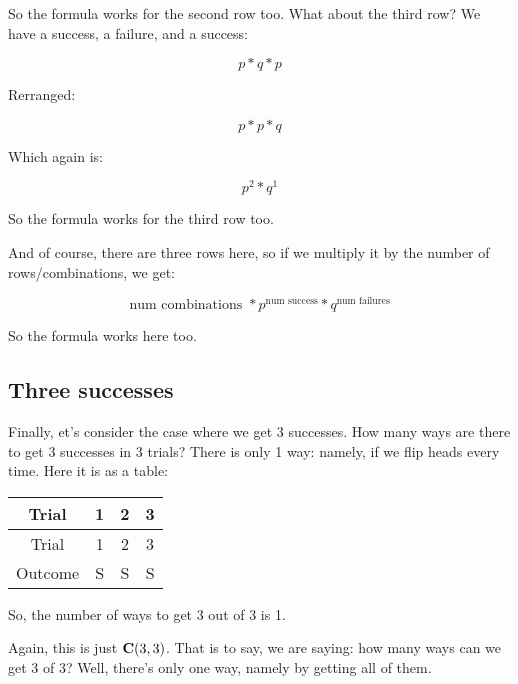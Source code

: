 \documentclass[../../../main.tex]{subfiles}
\begin{document}
So the formula works for the second row too. What about the third row? We have a success, a failure, and a success:

\begin{equation*}
    p * q * p
\end{equation*}

Rerranged:

\begin{equation*}
    p * p * q
\end{equation*}

Which again is:

\begin{equation*}
    p^{2} * q^{1}
\end{equation*}

So the formula works for the third row too.

And of course, there are three rows here, so if we multiply it by the number of rows/combinations, we get:

\begin{equation*}
    \text{num combinations } * p^{\text{num success}} * q^{\text{num failures}}
\end{equation*}

So the formula works here too.


\subsection{Three successes}

Finally, et's consider the case where we get 3 successes. How many ways are there to get 3 successes in 3 trials? There is only 1 way: namely, if we flip heads every time. Here it is as a table:

\begin{center}
  \begin{tabular}{| c | c | c | c |}
    \hline
      \textbf{Trial} & \textbf{1} & \textbf{2} & \textbf{3} \\ \hline
    Trial & 1 & 2 & 3 \\ \hline
  Outcome & S & S & S \\ \hline
  \end{tabular}
\end{center}

\noindent
So, the number of ways to get 3 out of 3 is 1.

Again, this is just $\mathbf{C}(3, 3)$. That is to say, we are saying: how many ways can we get 3 of 3? Well, there's only one way, namely by getting all of them.
\end{document}
